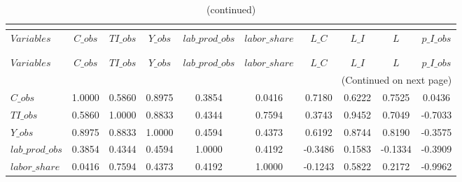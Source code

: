  
\begin{center}
\begin{longtable}{lccccccccc} 
\caption{MATRIX OF CORRELATIONS}\\
 \label{Table:th_corr_matrix}\\
\toprule 
$Variables       $	 & 	 $           C\_obs$	 & 	 $          TI\_obs$	 & 	 $           Y\_obs$	 & 	 $  lab\_prod\_obs$	 & 	 $     labor\_share$	 & 	 $             L\_C$	 & 	 $             L\_I$	 & 	 $                 L$	 & 	 $       p\_I\_obs$\\
\midrule \endfirsthead 
\caption{(continued)}\\
 \toprule \\ 
$Variables       $	 & 	 $           C\_obs$	 & 	 $          TI\_obs$	 & 	 $           Y\_obs$	 & 	 $  lab\_prod\_obs$	 & 	 $     labor\_share$	 & 	 $             L\_C$	 & 	 $             L\_I$	 & 	 $                 L$	 & 	 $       p\_I\_obs$\\
\midrule \endhead 
\midrule \multicolumn{10}{r}{(Continued on next page)} \\ \bottomrule \endfoot 
\bottomrule \endlastfoot 
$C\_obs          $	 & 	            1.0000	 & 	            0.5860	 & 	            0.8975	 & 	            0.3854	 & 	            0.0416	 & 	            0.7180	 & 	            0.6222	 & 	            0.7525	 & 	            0.0436 \\ 
$TI\_obs         $	 & 	            0.5860	 & 	            1.0000	 & 	            0.8833	 & 	            0.4344	 & 	            0.7594	 & 	            0.3743	 & 	            0.9452	 & 	            0.7049	 & 	           -0.7033 \\ 
$Y\_obs          $	 & 	            0.8975	 & 	            0.8833	 & 	            1.0000	 & 	            0.4594	 & 	            0.4373	 & 	            0.6192	 & 	            0.8744	 & 	            0.8190	 & 	           -0.3575 \\ 
$lab\_prod\_obs  $	 & 	            0.3854	 & 	            0.4344	 & 	            0.4594	 & 	            1.0000	 & 	            0.4192	 & 	           -0.3486	 & 	            0.1583	 & 	           -0.1334	 & 	           -0.3909 \\ 
$labor\_share    $	 & 	            0.0416	 & 	            0.7594	 & 	            0.4373	 & 	            0.4192	 & 	            1.0000	 & 	           -0.1243	 & 	            0.5822	 & 	            0.2172	 & 	           -0.9962 \\ 

\end{longtable}
\end{center}
